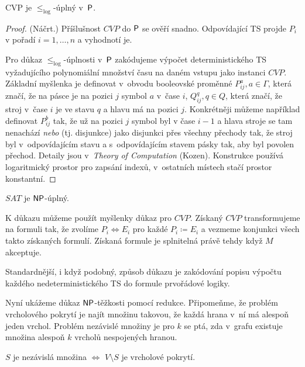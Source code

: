 \begin{theorem}
    CVP je $\leq_{\log}$-úplný v~$\P$.
\end{theorem}

\begin{proof} (Náčrt.)
    Příšlušnost $CVP$ do $\P$ se ověří snadno. Odpovídající TS projde
    $P_i$ v pořadí $i = 1,\ldots,n$ a vyhodnotí je.

    Pro důkaz $\leq_{\log}$-úplnosti v~$\P$ zakódujeme výpočet
    deterministického TS vyžadujícího polynomiální množství času na
    daném vstupu jako instanci $CVP$.
    Základní myšlenka je definovat v~obvodu booleovské proměnné
    $P^{a}_{ij}, a \in \Gamma$, která značí, že na pásce je na pozici
    $j$ symbol $a$ v~čase $i$,
    $Q^q_{ij}, q \in Q$, která značí, že stroj v~čase $i$ je ve stavu $q$
    a hlavu má na pozici $j$.
    Konkrétněji můžeme například definovat $P^{b}_{ij}$ tak,
    že už na pozici $j$ symbol byl v čase $i-1$ a hlava stroje se tam
    nenachází {\em nebo} (tj. disjunkce)
    jako disjunkci přes všechny přechody tak, že stroj byl
    v~odpovídajícím stavu a s~odpovídajícím stavem pásky tak, aby byl
    povolen přechod.
    Detaily jsou v~{\em Theory of Computation} (Kozen).
    Konstrukce používá logaritmický prostor pro zapsání indexů,
    v~ostatních místech stačí prostor konstantní.
\end{proof}

\begin{theorem}
    $SAT$ je $\NP$-úplný.
\end{theorem}

K důkazu můžeme použít myšlenky důkaz pro $CVP$.
Získaný $CVP$ transformujeme na formuli tak, že zvolíme
$P_i \Leftrightarrow E_i$ pro každé $P_i \coloneqq E_i$
a vezmeme konjunkci všech takto získaných formulí. Získaná formule je
splnitelná právě tehdy když $M$ akceptuje.

Standardnější, i když podobný, způsob důkazu je zakódování popisu
výpočtu každého nedeterministického TS do formule prvořádové logiky.


Nyní ukážeme důkaz $\NP$-těžkosti pomocí redukce. Připomeňme, že problém
vrcholového pokrytí je najít množinu takovou, že každá hrana v~ní má
alespoň jeden vrchol. Problém nezávislé množiny je pro $k$ se ptá, zda
v~grafu existuje množina alespoň $k$ vrcholů nespojených hranou.

\begin{theorem}
    $S$ je nezávislá množina $\iff$ $V \setminus S$ je vrcholové
    pokrytí.
\end{theorem}


